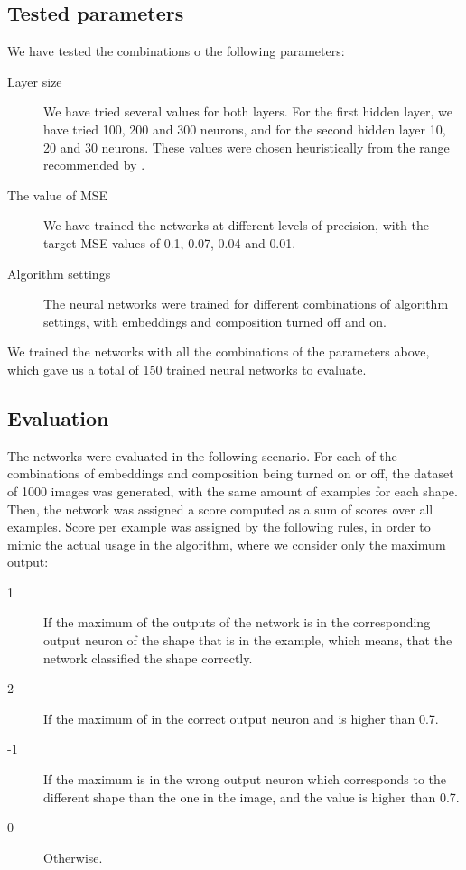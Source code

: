 \subsection{Tested parameters}
We have tested the combinations o the following parameters:
\begin{description}
\item [Layer size] We have tried several values for both layers. For the first hidden layer, we have tried 100, 200 and 300 neurons, and for the second hidden layer 10, 20 and 30 neurons. These values were chosen heuristically from the range recommended by \citet{layerSize}.
\item [The value of MSE] We have trained the networks at different levels of precision, with the target MSE values of 0.1, 0.07, 0.04 and 0.01.
\item [Algorithm settings] The neural networks were trained for different combinations of algorithm settings, with embeddings and composition turned off and on.
\end{description}
We trained the networks with all the combinations of the parameters above, which gave us a total of 150 trained neural networks to evaluate.

\subsection{Evaluation}
The networks were evaluated in the following scenario. For each of the combinations of embeddings and composition being turned on or off, the dataset of 1000 images was generated, with the same amount of examples for each shape. Then, the network was assigned a score computed as a sum of scores over all examples. Score per example was assigned by the following rules, in order to mimic the actual usage in the algorithm, where we consider only the maximum output:

\begin{description}
\item [1] If the maximum of the outputs of the network is in the corresponding output neuron of the shape that is in the example, which means, that the network classified the shape correctly.
\item [2] If the maximum of in the correct output neuron and is higher than 0.7. 
\item [-1] If the maximum is in the wrong output neuron which corresponds to the different shape than the one in the image, and the value is higher than 0.7.
\item [0] Otherwise.
\end{description}

